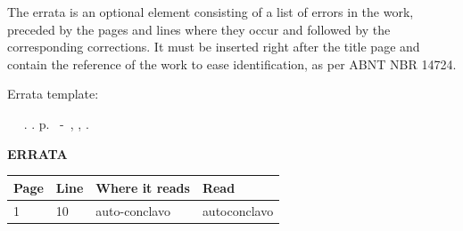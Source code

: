 \begin{errata}
    The errata is an optional element consisting of a list of errors in the work, preceded by the pages and lines where they occur and followed by the corresponding corrections. It must be inserted right after the title page and contain the reference of the work to ease identification, as per ABNT NBR 14724.

    Errata template:

    \begin{flushleft}
        \setlength{\absparsep}{0pt}
        \SingleSpacing
        \imprimirautorabr~ ~\textbf{\imprimirtituloresumo}.	\imprimirdata. \pageref{LastPage} p.
        \imprimirtipotrabalho~-~\imprimirinstituicao, \imprimirlocal, \imprimirdata.
    \end{flushleft}
    \vspace{\onelineskip}
    \OnehalfSpacing
    \center
    \textbf{ERRATA}
    \vspace{\onelineskip}
    \OnehalfSpacing
    \begin{table}[htb]
        \center
        \footnotesize
        \begin{tabular}{p{2cm} p{2cm} p{4cm} p{4cm} }
            \hline
            \textbf{Page} & \textbf{Line}  & \textbf{Where it reads}  & \textbf{Read}  \\
            \hline
            1 & 10 & auto-conclavo & autoconclavo\\
            \hline
        \end{tabular}
    \end{table}
\end{errata}

